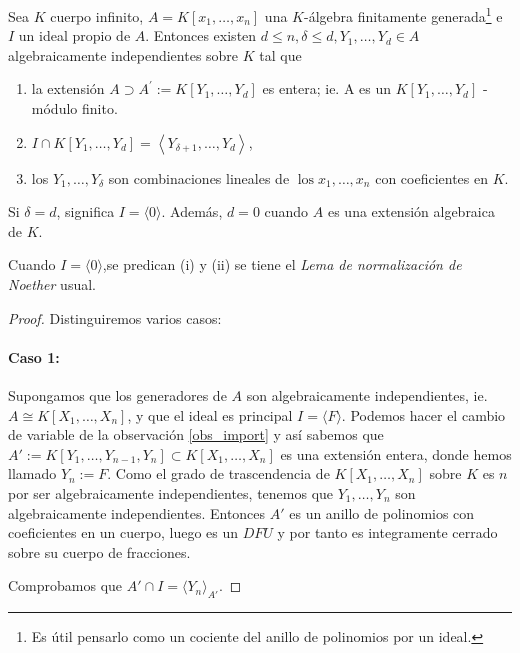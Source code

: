 \documentclass[../main.tex]{subfiles}
\begin{document}
\begin{theorem}
Sea $K$ cuerpo infinito, $A=K\left[x_{1}, \ldots, x_{n}\right]$ una $K$-álgebra finitamente generada\footnote{Es útil pensarlo como un cociente del anillo de polinomios por un ideal.} e $I$ un ideal propio de $A$. Entonces existen $d \leq n, \delta \leq d, Y_{1}, \ldots, Y_{d} \in A$ algebraicamente independientes
sobre $K$ tal que
\begin{enumerate}
  \item la extensión $A \supset A^{\prime}:=K\left[Y_{1}, \ldots, Y_{d}\right]$ es entera; ie. A es un $K\left[Y_{1}, \ldots, Y_{d}\right]$ -módulo finito.
  \item $I \cap K[Y_{1}, \ldots, Y_{d}]=\left\langle Y_{\delta+1}, \ldots, Y_{d}\right\rangle$,
  \item los $Y_{1}, \ldots, Y_{\delta}$ son combinaciones lineales de $\operatorname{los} x_{1}, \ldots, x_{n}$ con coeficientes en $K$.
\end{enumerate}
\end{theorem}

\begin{remark}
Si $\delta=d$, significa $I=\langle 0\rangle$. Además, $d=0$ cuando $A$ es una extensión algebraica de $K$.
\end{remark}

\begin{remark}
Cuando $I=\langle 0\rangle$,se predican (i) y (ii) se tiene el \emph{Lema de normalización de Noether} usual.
\end{remark}

\begin{proof}
Distinguiremos varios casos:

\paragraph{Caso 1:} Supongamos que los generadores de $A$ son algebraicamente independientes, ie. $A\cong K[X_1, \dots, X_n]$, y que el ideal es principal $I = \langle F \rangle$. Podemos hacer el cambio de variable de la observación \ref{obs_import} y así sabemos que $A':= K[Y_1, \dots, Y_{n-1}, Y_n] \subset K[X_1, \dots, X_n]$ es una extensión entera, donde hemos llamado $Y_n := F$. Como el grado de trascendencia de $K[X_1, \dots, X_n]$ sobre $K$ es $n$ por ser algebraicamente independientes, tenemos que $Y_1, \dots, Y_n$ son algebraicamente independientes.
Entonces $A'$ es un anillo de polinomios con coeficientes en un cuerpo, luego es un $DFU$ y por tanto es integramente cerrado sobre su cuerpo de fracciones.

Comprobamos que $A' \cap I = \langle Y_n \rangle_{A'}$.
\end{proof}
\end{document}
